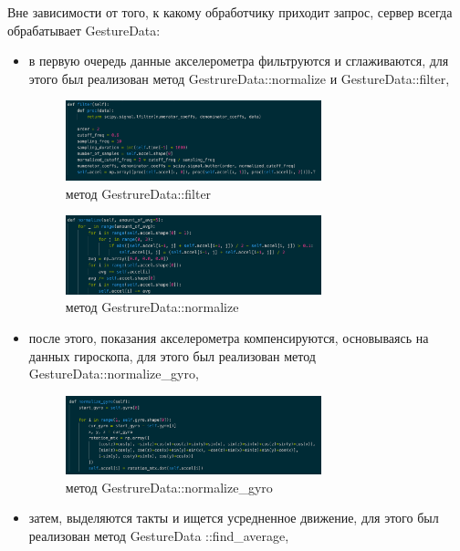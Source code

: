 Вне зависимости от того, к какому обработчику приходит запрос, сервер всегда обрабатывает GestureData:
\begin{itemize}
  \item в первую очередь данные акселерометра фильтруются и сглаживаются, для этого был реализован метод GestrureData::normalize и GestureData::filter, \newline
  \begin{figure}[H]
    \begin{center}
        \includegraphics[width=0.7\textwidth]{images/filter.png}
    \end{center}
    \caption{метод GestrureData::filter}
\end{figure}
\begin{figure}[H]
  \begin{center}
      \includegraphics[width=0.7\textwidth]{images/normalize.png}
  \end{center}
  \caption{метод GestrureData::normalize}
\end{figure}
  \item после этого, показания акселерометра компенсируются, основываясь на данных гироскопа, для этого был реализован метод GestureData::normalize\_gyro,
  \begin{figure}[H]
    \begin{center}
        \includegraphics[width=0.7\textwidth]{images/norm_gyro.png}
    \end{center}
    \caption{метод GestrureData::normalize\_gyro}
  \end{figure}
  \item затем, выделяются такты и ищется усредненное движение, для этого был реализован метод GestureData ::find\_average,

\end{itemize}
